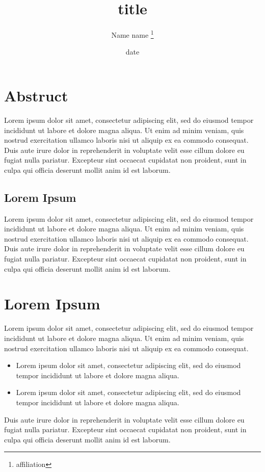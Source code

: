 \documentclass[a4paper, dvipdfmx, 11pt]{jsarticle}
\title{\textbf{title}}
\author{\setcounter{footnote}{1}Name name
\thanks{affiliation}
\date{date}
}
\begin{document}
\maketitle

\section{Abstruct}
Lorem ipsum dolor sit amet, consectetur adipiscing elit, sed do eiusmod tempor incididunt ut labore et dolore magna aliqua.
Ut enim ad minim veniam, quis nostrud exercitation ullamco laboris nisi ut aliquip ex ea commodo consequat.
Duis aute irure dolor in reprehenderit in voluptate velit esse cillum dolore eu fugiat nulla pariatur.
Excepteur sint occaecat cupidatat non proident, sunt in culpa qui officia deserunt mollit anim id est laborum.

 \subsection{Lorem Ipsum}
 Lorem ipsum dolor sit amet, consectetur adipiscing elit, sed do eiusmod tempor incididunt ut labore et dolore magna aliqua.
 Ut enim ad minim veniam, quis nostrud exercitation ullamco laboris nisi ut aliquip ex ea commodo consequat.
 Duis aute irure dolor in reprehenderit in voluptate velit esse cillum dolore eu fugiat nulla pariatur.
 Excepteur sint occaecat cupidatat non proident, sunt in culpa qui officia deserunt mollit anim id est laborum.

\section{Lorem Ipsum}
Lorem ipsum dolor sit amet, consectetur adipiscing elit, sed do eiusmod tempor incididunt ut labore et dolore magna aliqua.
Ut enim ad minim veniam, quis nostrud exercitation ullamco laboris nisi ut aliquip ex ea commodo consequat.
\begin{itemize}
 \item Lorem ipsum dolor sit amet, consectetur adipiscing elit, sed do eiusmod tempor incididunt ut labore et dolore magna aliqua.
 \item Lorem ipsum dolor sit amet, consectetur adipiscing elit, sed do eiusmod tempor incididunt ut labore et dolore magna aliqua.
\end{itemize}
Duis aute irure dolor in reprehenderit in voluptate velit esse cillum dolore eu fugiat nulla pariatur.
Excepteur sint occaecat cupidatat non proident, sunt in culpa qui officia deserunt mollit anim id est laborum.
\end{document}
